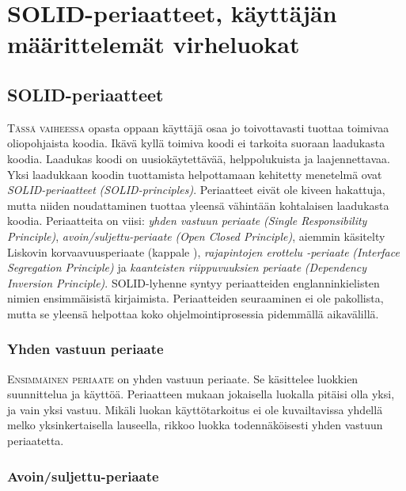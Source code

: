 \documentclass[openany]{book}
\newcommand{\newthought}[1]{\smallskip\textsc{#1}}
\newcommand{\eng}[1]{\textit{(#1)}}
\newcommand{\new}[1]{\textit{\gls{#1}}}
\newcommand{\neweng}[2]{\new{#1} \eng{#2}}
\begin{document}
\addtocounter{chapter}{1}
\chapter{SOLID-periaatteet, käyttäjän\\määrittelemät virheluokat}
\label{solid+exceptions}


\section{SOLID-periaatteet}
\label{solid}

\newthought{Tässä vaiheessa} opasta oppaan käyttäjä osaa jo toivottavasti tuottaa toimivaa
oliopohjaista koodia. Ikävä kyllä toimiva koodi ei tarkoita suoraan laadukasta koodia. Laadukas
koodi on uusiokäytettävää, helppolukuista ja laajennettavaa. Yksi laadukkaan koodin tuottamista
helpottamaan kehitetty menetelmä ovat \neweng{SOLID-periaatteet}{SOLID-principles}. Periaatteet
eivät ole kiveen hakattuja, mutta niiden noudattaminen tuottaa yleensä vähintään kohtalaisen
laadukasta koodia. Periaatteita on viisi: \neweng{yhden vastuun periaate}{Single Responsibility
Principle}, \neweng{avoin/suljettu-periaate}{Open Closed Principle}, aiemmin käsitelty
\gls{Liskovin korvaavuusperiaate} (kappale ), \neweng{rajapintojen erottelu
-periaate}{Interface Segregation Principle} ja \neweng{kaanteisten riippuvuuksien periaate}
{Dependency Inversion Principle}. SOLID-lyhenne syntyy periaatteiden englanninkielisten nimien
ensimmäisistä kirjaimista. Periaatteiden seuraaminen ei ole pakollista, mutta se yleensä helpottaa
koko ohjelmointiprosessia pidemmällä aikavälillä.

\subsection{Yhden vastuun periaate}
\label{SRP}

\newthought{Ensimmäinen periaate} on \gls{yhden vastuun periaate}. Se käsittelee luokkien
suunnittelua ja käyttöä. Periaatteen mukaan jokaisella luokalla pitäisi olla yksi, ja vain yksi
vastuu. Mikäli luokan käyttötarkoitus ei ole kuvailtavissa yhdellä melko yksinkertaisella
lauseella, rikkoo luokka todennäköisesti yhden vastuun periaatetta.

\subsection{Avoin/suljettu-periaate}
\label{OCP}
\end{document}
